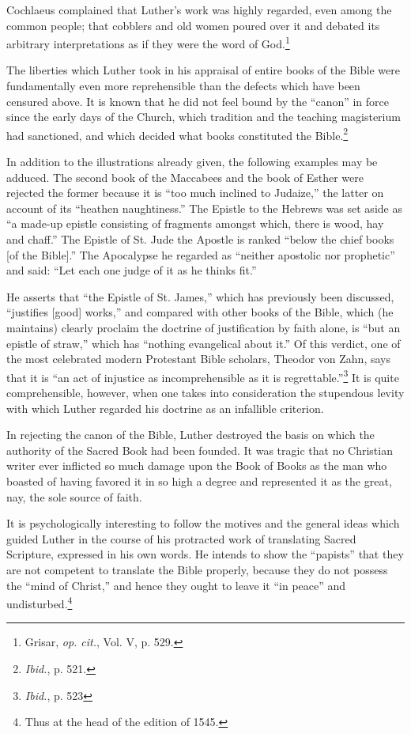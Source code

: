 Cochlaeus complained that Luther’s work was highly regarded,
even among the common people; that cobblers and old women poured
over it and debated its arbitrary interpretations as if they were the
word of God.\footnote{Grisar, \textit{op. cit.}, Vol. V, p. 529.}

The liberties which Luther took in his appraisal of entire books of
the Bible were fundamentally even more reprehensible than the defects
which have been censured above. It is known that he did not feel
bound by the “canon” in force since the early days of the Church,
which tradition and the teaching magisterium had sanctioned, and
which decided what books constituted the Bible.\footnote{\textit{Ibid.}, p. 521.}

In addition to the illustrations already given, the following examples may
be adduced. The second book of the Maccabees and the book of Esther were
rejected the former because it is “too much inclined to Judaize,” the latter
on account of its “heathen naughtiness.” The Epistle to the Hebrews was
set aside as “a made-up epistle consisting of fragments amongst which,
there is wood, hay and chaff.” The Epistle of St. Jude the Apostle is
ranked “below the chief books [of the Bible].” The Apocalypse he regarded
as “neither apostolic nor prophetic” and said: “Let each one judge of it as he
thinks fit.”

He asserts that “the Epistle of St. James,” which has previously been discussed,
“justifies [good] works,” and compared with other books of the
Bible, which (he maintains) clearly proclaim the doctrine of justification
by faith alone, is “but an epistle of straw,” which has “nothing
evangelical about it.” Of this verdict, one of the most celebrated modern
Protestant Bible scholars, Theodor von Zahn, says that it is “an act of injustice
as incomprehensible as it is regrettable.”\footnote{\textit{Ibid.}, p. 523}
 It is quite comprehensible,
however, when one takes into consideration the stupendous levity with which
Luther regarded his doctrine as an infallible criterion.

In rejecting the canon of the Bible, Luther destroyed the basis on
which the authority of the Sacred Book had been founded. It was
tragic that no Christian writer ever inflicted so much damage upon
the Book of Books as the man who boasted of having favored it in so
high a degree and represented it as the great, nay, the sole source of
faith.

It is psychologically interesting to follow the motives and the
general ideas which guided Luther in the course of his protracted
work of translating Sacred Scripture, expressed in his own words.
He intends to show the “papists” that they are not competent to
translate the Bible properly, because they do not possess the “mind of
Christ,” and hence they ought to leave it “in peace” and undisturbed.\footnote{Thus at the head of the edition of 1545.}

